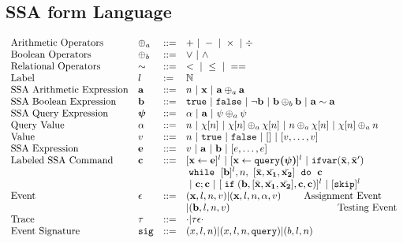 %
%
\subsection{SSA form Language}
\[
\begin{array}{llll}
 \mbox{Arithmetic Operators} 
& \oplus_a & ::= & + ~|~ - ~|~ \times 
%
~|~ \div \\  
\mbox{Boolean Operators} 
& \oplus_b & ::= & \lor ~|~ \land
\\
\mbox{Relational Operators} 
& \sim & ::= & < ~|~ \leq ~|~ == 
\\  
%
\mbox{Label} 
& l & := & \mathbb{N} 
\\ 
%
\mbox{SSA Arithmetic Expression} 
& \saexpr & ::= & 
n ~|~ \ssa{x} ~|~ \saexpr \oplus_a \saexpr  
\\
%
\mbox{SSA Boolean Expression} & \sbexpr & ::= & 
	\etrue ~|~ \efalse  ~|~ \neg \sbexpr
	 ~|~ \sbexpr \oplus_b \sbexpr
	~|~ \saexpr \sim \saexpr 
	\\
%
\mbox{SSA Query Expression} 
& \ssa{\qexpr} & ::= 
& { \qval ~|~ \saexpr ~|~ \qexpr \oplus_a \qexpr} 
\\
%
\mbox{Query Value} & \qval & ::= 
& {n ~|~ \chi[n] ~|~ \chi[n] \oplus_a  \chi[n] ~|~ n \oplus_a  \chi[n]
~|~ \chi[n] \oplus_a  n}
\\
%
\mbox{Value} 
& v & ::= & { n \sep \etrue \sep \efalse ~|~ [] ~|~ [v, \dots, v]}  
\\
%
\mbox{SSA Expression} & \sexpr & ::= & v ~|~ \saexpr \sep \sbexpr ~|~ [\expr, \dots, \expr]
\\	
%
\mbox{Labeled SSA Command} 
& \ssa{c} & ::= &   [\assign {\ssa{x}}{ \ssa{\expr}}]^{l} ~|~  [\assign {\ssa{x} } {\ssa{\query(\qexpr)}}]^{l}
%
~|~  {{\eifvar(\bar{\ssa{x}}, \bar{\ssa{x}}')}} 
%
\\ 
&&& 
{\ewhile ~ [ \sbexpr ]^{l} , n,
~ 
[\bar{\ssa{x}}, \bar{\ssa{x_1}}, \bar{\ssa{x_2}}] 
~ \edo ~  \ssa{c} }
\\
&&&
~|~ \ssa{c};\ssa{c}  
~|~ [\eif(\sbexpr, [\bar{\ssa{x}}, \bar{\ssa{x_1}}, \bar{\ssa{x_2}}] , \ssa{c}, \ssa{c})]^l 
~|~ [\eskip]^{l} 
\\
%
\mbox{Event} 
& \event & ::= & 
      (\ssa{x}, l, n, v) | (\ssa{x}, l, n, \qval, v)  ~~~~~~~ \mbox{Assignment Event} \\
&&& | (\sbexpr, l, n, v)   ~~~~~~~~~~~~~~~~~~~~~~~~~~~~~~~~~ \mbox{Testing Event}
\\
%
\mbox{Trace} & \vtrace
& ::= & \cdot | \vtrace \event \cdot
\\
%
\mbox{Event Signature} & \sig
& ::= & (x, l, n) | (x, l, n, \query) | (b, l, n)
\end{array}
\]
